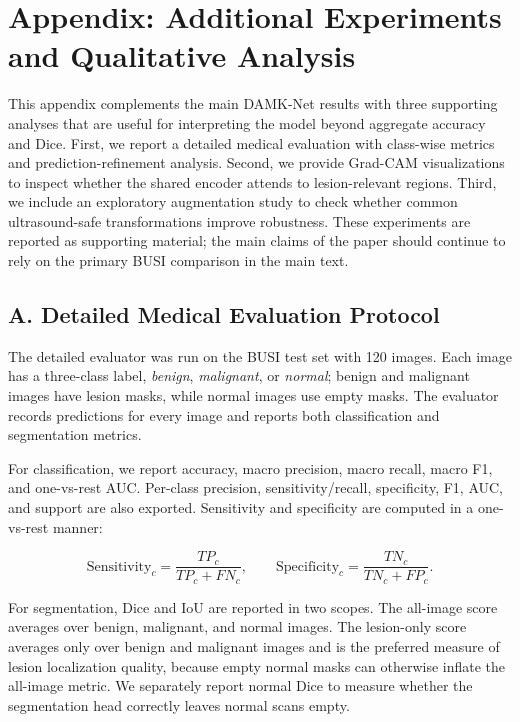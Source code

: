 \providecommand{\appendixevidencedir}{report/report_images/appendix_evidence}

\section*{Appendix: Additional Experiments and Qualitative Analysis}

This appendix complements the main DAMK-Net results with three supporting analyses that are useful for interpreting the model beyond aggregate accuracy and Dice. First, we report a detailed medical evaluation with class-wise metrics and prediction-refinement analysis. Second, we provide Grad-CAM visualizations to inspect whether the shared encoder attends to lesion-relevant regions. Third, we include an exploratory augmentation study to check whether common ultrasound-safe transformations improve robustness. These experiments are reported as supporting material; the main claims of the paper should continue to rely on the primary BUSI comparison in the main text.

\subsection*{A. Detailed Medical Evaluation Protocol}

The detailed evaluator was run on the BUSI test set with 120 images. Each image has a three-class label, \textit{benign}, \textit{malignant}, or \textit{normal}; benign and malignant images have lesion masks, while normal images use empty masks. The evaluator records predictions for every image and reports both classification and segmentation metrics.

For classification, we report accuracy, macro precision, macro recall, macro F1, and one-vs-rest AUC. Per-class precision, sensitivity/recall, specificity, F1, AUC, and support are also exported. Sensitivity and specificity are computed in a one-vs-rest manner:

\[
\mathrm{Sensitivity}_c = \frac{TP_c}{TP_c+FN_c},
\qquad
\mathrm{Specificity}_c = \frac{TN_c}{TN_c+FP_c}.
\]

For segmentation, Dice and IoU are reported in two scopes. The all-image score averages over benign, malignant, and normal images. The lesion-only score averages only over benign and malignant images and is the preferred measure of lesion localization quality, because empty normal masks can otherwise inflate the all-image metric. We separately report normal Dice to measure whether the segmentation head correctly leaves normal scans empty.

